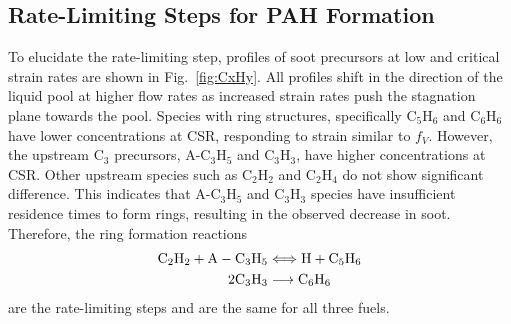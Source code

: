 \subsection{Rate-Limiting Steps for PAH Formation}

To elucidate the rate-limiting step, profiles of soot precursors at low and critical strain rates are shown in Fig.~\ref{fig:CxHy}. All profiles shift in the direction of the liquid pool at higher flow rates as increased strain rates push the stagnation plane towards the pool. Species with ring structures, specifically C$_5$H$_6$ and C$_6$H$_6$ have lower concentrations at CSR, responding to strain similar to $f_V$. However, the upstream C$_3$ precursors, A-C$_3$H$_5$ and C$_3$H$_3$, have higher concentrations at CSR. Other upstream species such as C$_2$H$_2$ and C$_2$H$_4$ do not show significant difference.  This indicates that A-C$_3$H$_5$ and C$_3$H$_3$ species have insufficient residence times to form rings, resulting in the observed decrease in soot. Therefore, the ring formation reactions
\begin{align*}
  {\rm C}_2{\rm H}_2 + {\rm A}-{\rm C}_3{\rm H}_5 &\Longleftrightarrow {\rm H} + {\rm C}_5{\rm H}_6\\
  2 {\rm C}_3{\rm H}_3 &\longrightarrow {\rm C}_6{\rm H}_6
\end{align*}
are the rate-limiting steps and are the same for all three fuels.


